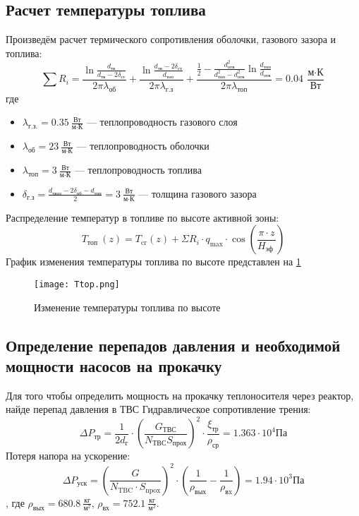 \subsection{Расчет температуры топлива}
    Произведём расчет термического сопротивления оболочки, газового зазора и топлива:
$$
\sum R_i = 
\frac {\ln \frac {d_{\text{тв}}}{d_{\text{тв}} - 2\delta_{ст}}  }{2\pi\lambda_{\text{об}}}+\frac {\ln \frac {d_{\text{тв}} - 2\delta_{ст}}{d_{\text{топ}}}  }{2\pi\lambda_{\text{г.з}}}+\frac {\frac 1 2 - \frac {d_{\text{отв}}^2} {d_{\text{топ}}^2 - d_{\text{отв}}^2}\ln \frac {d_{\text{топ}}}{d_{\text{отв}}}} {2 \pi \lambda_{\text{топ}}} = 0.04\  \frac{\text{м} \cdot \text{К}}{\text{Вт}}
$$
где
\begin{itemize}
    \item $\lambda_{\text{г.з.}} = 0.35\  \frac {\text{Вт}}{\text{м} \cdot \text{К}}$ — теплопроводность газового слоя 
    \item $\lambda_{\text{об}} = 23\  \frac {\text{Вт}}{\text{м} \cdot \text{К}}$ — теплопроводность оболочки 
    \item $\lambda_{\text{топ}} = 3\  \frac {\text{Вт}}{\text{м} \cdot \text{К}}$ — теплопроводность топлива
    \item $\delta_{\text{г.з}} =\frac {d_{\text{твэл}} - 2\delta_{\text{об}} - d_{\text{топ}}}{2} =  3\  \frac {\text{Вт}}{\text{м} \cdot \text{К}}$ — толщина газового зазора 
\end{itemize}
Распределение температур в топливе по высоте активной зоны:
$$
T_{\text {топ }}(z)=T_{\mathrm{cr}}(z)+\Sigma R_{i} \cdot q_{\max } \cdot \cos \left(\frac{\pi \cdot z}{H_{\text {эф }}}\right)
$$
График изменения температуры топлива по высоте представлен на \ref{pic:top}
\begin{figure}[H]
	\begin{center}
		\texttt{[image: Ttop.png]}
		\caption{Изменение температуры топлива по высоте}
		\label{pic:top} %
	\end{center}
\end{figure}


\subsection{Определение перепадов давления и необходимой мощности насосов на прокачку}
Для того чтобы определить мощность на прокачку теплоносителя через реактор, найде перепад давления в ТВС
Гидравлическое сопротивление трения:
$$
\Delta P_{\text{тр}} = \frac 1 {2 d_{\text{г}}} \cdot \left(\frac {G_{\text{ТВС}}}{N_{\text{ТВС}}S_{\text{прох}}}  \right)^2 \cdot \frac {\xi_{\text{тр}}} {\rho_{\text{ср}}} = 1.363 \cdot 10^4 \text{Па}
$$
Потеря напора на ускорение:
$$
\Delta P_{\mathrm{уск}}=\left(\frac{G}{N_{\mathrm{TBC}} \cdot S_{\mathrm{npox}}}\right)^{2} \cdot\left(\frac{1}{\rho_{\mathrm{вых}}}-\frac{1}{\rho_{\mathrm{вx}}}\right) = 1.94 \cdot 10^3 \text{Па}
$$, где $\rho_{\text{вых}} = 680.8\  \frac {\text{кг}}{\text{м}^2} $, $\rho_{\text{вх}} =752.1\  \frac {\text{кг}}{\text{м}^2}$.

